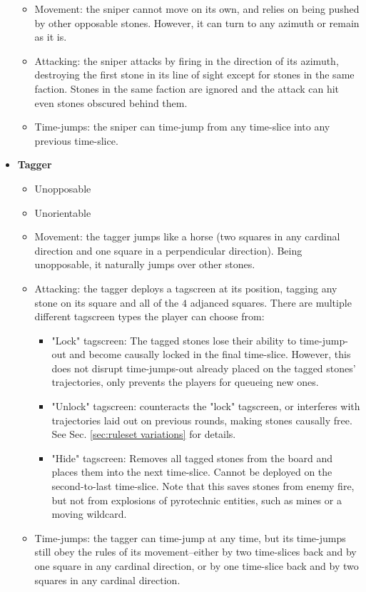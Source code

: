 \documentclass[12pt]{article}
\begin{document}
\begin{itemize}
\begin{itemize}
		\item Movement: the sniper cannot move on its own, and relies on being pushed by other opposable stones. However, it can turn to any azimuth or remain as it is.
		\item Attacking: the sniper attacks by firing in the direction of its azimuth, destroying the first stone in its line of sight except for stones in the same faction. Stones in the same faction are ignored and the attack can hit even stones obscured behind them.
		\item Time-jumps: the sniper can time-jump from any time-slice into any previous time-slice.
		\end{itemize}
	\item \textbf{Tagger}
		\begin{itemize}
		\item Unopposable
		\item Unorientable
		\item Movement: the tagger jumps like a horse (two squares in any cardinal direction and one square in a perpendicular direction). Being unopposable, it naturally jumps over other stones.
		\item Attacking: the tagger deploys a tagscreen at its position, tagging any stone on its square and all of the $4$ adjanced squares. There are multiple different tagscreen types the player can choose from:
		\begin{itemize}
			\item "Lock" tagscreen: The tagged stones lose their ability to time-jump-out and become causally locked in the final time-slice. However, this does not disrupt time-jumps-out already placed on the tagged stones' trajectories, only prevents the players for queueing new ones.
			\item "Unlock" tagscreen: counteracts the "lock" tagscreen, or interferes with trajectories laid out on previous rounds, making stones causally free. See Sec. \ref{sec:ruleset variations} for details.
			\item "Hide" tagscreen: Removes all tagged stones from the board and places them into the next time-slice. Cannot be deployed on the second-to-last time-slice. Note that this saves stones from enemy fire, but not from explosions of pyrotechnic entities, such as mines or a moving wildcard.
		\end{itemize}
		\item Time-jumps: the tagger can time-jump at any time, but its time-jumps still obey the rules of its movement--either by two time-slices back and by one square in any cardinal direction, or by one time-slice back and by two squares in any cardinal direction.

\end{itemize}
\end{itemize}
\end{document}
